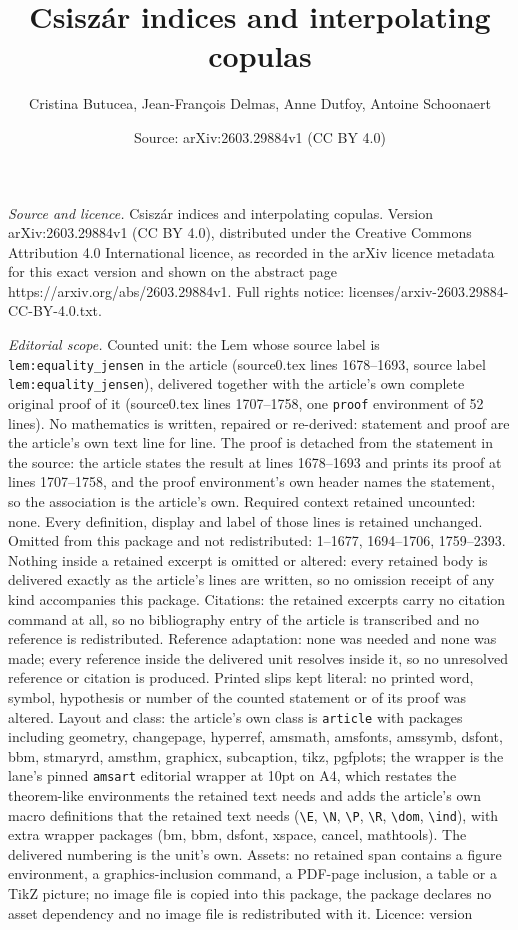 \documentclass[10pt,a4paper]{amsart}
\title[Csisz\'ar indices and interpolating copulas]{Csisz\'ar indices and interpolating copulas}
\author{Cristina Butucea, Jean-Fran\c{c}ois Delmas, Anne Dutfoy, Antoine Schoonaert}
\date{Source: arXiv:2603.29884v1 (CC BY 4.0)}
\begin{document}
\maketitle

\noindent\emph{Source and licence.} Csisz\'ar indices and interpolating copulas. Version arXiv:2603.29884v1 (CC BY 4.0), distributed under the Creative Commons Attribution 4.0 International licence, as recorded in the arXiv licence metadata for this exact version and shown on the abstract page https://arxiv.org/abs/2603.29884v1. Full rights notice: licenses/arxiv-2603.29884-CC-BY-4.0.txt.\par\smallskip

\noindent\textit{Editorial scope.} Counted unit: the Lem whose source label is \texttt{lem:equality\_jensen} in the article (source0.tex lines 1678--1693, source label \texttt{lem:equality\_jensen}), delivered together with the article's own complete original proof of it (source0.tex lines 1707--1758, one \texttt{proof} environment of 52 lines). No mathematics is written, repaired or re-derived: statement and proof are the article's own text line for line. The proof is detached from the statement in the source: the article states the result at lines 1678--1693 and prints its proof at lines 1707--1758, and the proof environment's own header names the statement, so the association is the article's own. Required context retained uncounted: none. Every definition, display and label of those lines is retained unchanged. Omitted from this package and not redistributed: 1--1677, 1694--1706, 1759--2393. Nothing inside a retained excerpt is omitted or altered: every retained body is delivered exactly as the article's lines are written, so no omission receipt of any kind accompanies this package. Citations: the retained excerpts carry no citation command at all, so no bibliography entry of the article is transcribed and no reference is redistributed. Reference adaptation: none was needed and none was made; every reference inside the delivered unit resolves inside it, so no unresolved reference or citation is produced. Printed slips kept literal: no printed word, symbol, hypothesis or number of the counted statement or of its proof was altered. Layout and class: the article's own class is \texttt{article} with packages including geometry, changepage, hyperref, amsmath, amsfonts, amssymb, dsfont, bbm, stmaryrd, amsthm, graphicx, subcaption, tikz, pgfplots; the wrapper is the lane's pinned \texttt{amsart} editorial wrapper at 10pt on A4, which restates the theorem-like environments the retained text needs and adds the article's own macro definitions that the retained text needs (\texttt{\textbackslash E}, \texttt{\textbackslash N}, \texttt{\textbackslash P}, \texttt{\textbackslash R}, \texttt{\textbackslash dom}, \texttt{\textbackslash ind}), with extra wrapper packages (bm, bbm, dsfont, xspace, cancel, mathtools). The delivered numbering is the unit's own. Assets: no retained span contains a figure environment, a graphics-inclusion command, a PDF-page inclusion, a table or a TikZ picture; no image file is copied into this package, the package declares no asset dependency and no image file is redistributed with it. Licence: version 
\end{document}

